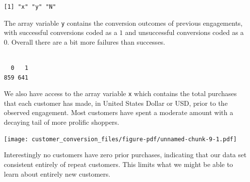 \documentclass[
  letterpaper,
  DIV=11,
  numbers=noendperiod]{scrartcl}
\newenvironment{Shaded}{\begin{snugshade}}{\end{snugshade}}
\newcommand{\AttributeTok}[1]{\textcolor[rgb]{0.40,0.45,0.13}{#1}}
\newcommand{\DecValTok}[1]{\textcolor[rgb]{0.68,0.00,0.00}{#1}}
\newcommand{\FunctionTok}[1]{\textcolor[rgb]{0.28,0.35,0.67}{#1}}
\newcommand{\NormalTok}[1]{\textcolor[rgb]{0.00,0.23,0.31}{#1}}
\newcommand{\SpecialCharTok}[1]{\textcolor[rgb]{0.37,0.37,0.37}{#1}}
\newcommand{\StringTok}[1]{\textcolor[rgb]{0.13,0.47,0.30}{#1}}
\begin{document}
\begin{verbatim}
[1] "x" "y" "N"
\end{verbatim}

The array variable \texttt{y} contains the conversion outcomes of
previous engagements, with successful conversions coded as a \(1\) and
unsuccessful conversions coded as a \(0\). Overall there are a bit more
failures than successes.

\begin{Shaded}
\end{Shaded}

\begin{verbatim}

  0   1 
859 641 
\end{verbatim}

We also have access to the array variable \texttt{x} which contains the
total purchases that each customer has made, in United States Dollar or
USD, prior to the observed engagement. Most customers have spent a
moderate amount with a decaying tail of more prolific shoppers.

\begin{Shaded}
\end{Shaded}

\texttt{[image: customer\_conversion\_files/figure-pdf/unnamed-chunk-9-1.pdf]}

Interestingly no customers have zero prior purchases, indicating that
our data set consistent entirely of repeat customers. This limits what
we might be able to learn about entirely new customers.

\begin{Shaded}
\end{Shaded}
\end{document}
